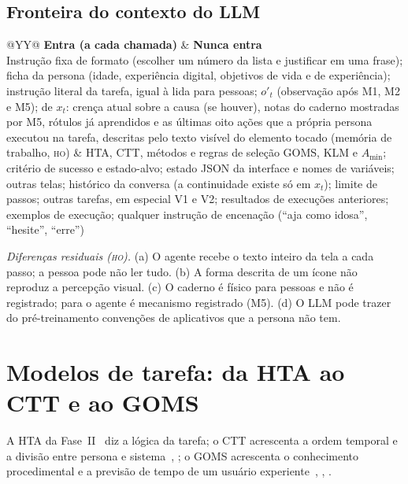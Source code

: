 \documentclass[conference,onecolumn]{IEEEtran}
\newcommand{\stHO}{\textsc{ho}}
\begin{document}
\subsection{Fronteira do contexto do LLM}
\begin{table}[!h]
\caption{O que entra e o que não entra no contexto do LLM}
\label{tab:fronteira}
\centering
\footnotesize
\begin{tabularx}{\textwidth}{@{}YY@{}}
\toprule
\textbf{Entra (a cada chamada)} & \textbf{Nunca entra} \\
\midrule
Instrução fixa de formato (escolher um número da lista e justificar em uma frase); ficha da persona (idade, experiência digital, objetivos de vida e de experiência); instrução literal da tarefa, igual à lida para pessoas; $o'_t$ (observação após M1, M2 e M5); de $x_t$: crença atual sobre a causa (se houver), notas do caderno mostradas por M5, rótulos já aprendidos e as últimas oito ações que a própria persona executou na tarefa, descritas pelo texto visível do elemento tocado (memória de trabalho, \stHO) & HTA, CTT, métodos e regras de seleção GOMS, KLM e $A_{\min}$; critério de sucesso e estado-alvo; estado JSON da interface e nomes de variáveis; outras telas; histórico da conversa (a continuidade existe só em $x_t$); limite de passos; outras tarefas, em especial V1 e V2; resultados de execuções anteriores; exemplos de execução; qualquer instrução de encenação (``aja como idosa'', ``hesite'', ``erre'') \\
\bottomrule
\end{tabularx}
\end{table}

\textit{Diferenças residuais (\stHO).} (a) O agente recebe o texto inteiro da tela a cada passo; a pessoa pode não ler tudo. (b) A forma descrita de um ícone não reproduz a percepção visual. (c) O caderno é físico para pessoas e não é registrado; para o agente é mecanismo registrado (M5). (d) O LLM pode trazer do pré-treinamento convenções de aplicativos que a persona não tem.

\section{Modelos de tarefa: da HTA ao CTT e ao GOMS}\label{sec:tarefas}

A HTA da Fase~II~\cite{annett1967} diz a lógica da tarefa; o CTT acrescenta a ordem temporal e a divisão entre persona e sistema~\cite{paterno2000}, \cite[seç.~18.3]{dix2004}; o GOMS acrescenta o conhecimento procedimental e a previsão de tempo de um usuário experiente~\cite{card1983}, \cite[cap.~12]{dix2004}, \cite{aula21}.
\end{document}
